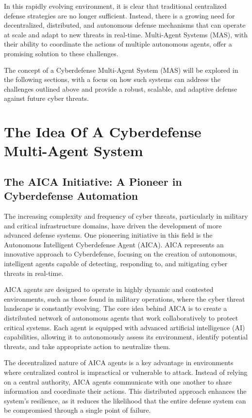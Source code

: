 In this rapidly evolving environment, it is clear that traditional centralized defense strategies are no longer sufficient. Instead, there is a growing need for decentralized, distributed, and autonomous defense mechanisms that can operate at scale and adapt to new threats in real-time. Multi-Agent Systems (MAS), with their ability to coordinate the actions of multiple autonomous agents, offer a promising solution to these challenges.

The concept of a Cyberdefense Multi-Agent System (MAS) will be explored in the following sections, with a focus on how such systems can address the challenges outlined above and provide a robust, scalable, and adaptive defense against future cyber threats.



\section{The Idea Of A Cyberdefense Multi-Agent System}

\subsection{The AICA Initiative: A Pioneer in Cyberdefense Automation}

The increasing complexity and frequency of cyber threats, particularly in military and critical infrastructure domains, have driven the development of more advanced defense systems. One pioneering initiative in this field is the Autonomous Intelligent Cyberdefense Agent (AICA). AICA represents an innovative approach to Cyberdefense, focusing on the creation of autonomous, intelligent agents capable of detecting, responding to, and mitigating cyber threats in real-time.

AICA agents are designed to operate in highly dynamic and contested environments, such as those found in military operations, where the cyber threat landscape is constantly evolving. The core idea behind AICA is to create a distributed network of autonomous agents that work collaboratively to protect critical systems. Each agent is equipped with advanced artificial intelligence (AI) capabilities, allowing it to autonomously assess its environment, identify potential threats, and take appropriate action to neutralize them.

The decentralized nature of AICA agents is a key advantage in environments where centralized control is impractical or vulnerable to attack. Instead of relying on a central authority, AICA agents communicate with one another to share information and coordinate their actions. This distributed approach enhances the system's resilience, as it reduces the likelihood that the entire defense system can be compromised through a single point of failure.

